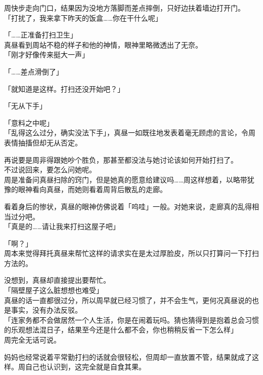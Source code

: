 周快步走向门口，结果因为没地方落脚而差点摔倒，只好边扶着墙边打开门。\\

「打扰了，我来拿下昨天的饭盒……你在干什么呢」

「……正准备打扫卫生」\\

真昼看到周站不稳的样子和他的神情，眼神里略微透出了无奈。\\

「刚才好像传来挺大一声」

「……差点滑倒了」

「就知道是这样。打扫还没开始吧？」

「无从下手」

「意料之中呢」\\

「乱得这么过分，确实没法下手」，真昼一如既往地发表着毫无顾虑的言论，令周表情抽搐但却无从否定。

再说要是周非得跟她吵个胜负，那甚至都没法与她讨论该如何开始打扫了。\\

不过说回来，要怎么问她呢。\\

周是准备问真昼扫除的窍门，但是她真的愿意给建议吗……周这样想着，以略带犹豫的眼神看向真昼，而她则看着周背后散乱的走廊。

看着身后的惨状，真昼的眼神仿佛说着「呜哇」一般。对她来说，走廊真的乱得相当过分吧。\\

「真是的……请让我来打扫这屋子吧」

「啊？」\\

周本来觉得拜托真昼来帮忙这样的请求实在是太过厚脸皮，所以只打算问一下打扫方法的。

没想到，真昼却直接提出要帮忙。\\

「隔壁屋子这么脏想想也难受」\\

真昼的话一直都很过分，所以周早就已经习惯了，并不会生气，更何况真昼说的也是事实，没有办法反驳。\\

「连家务都不会做居然一个人生活，你是在闹着玩吗。猜也猜得到是抱着总会习惯的乐观想法混日子，结果至今还是什么都不会，你也稍稍反省一下怎么样」\\

周完全无话可说。

妈妈也经常说着平常勤打扫的话就会很轻松，但周却一直放置不管，结果就成了这样。周自己也认识到，这完全就是自食其果。\\

